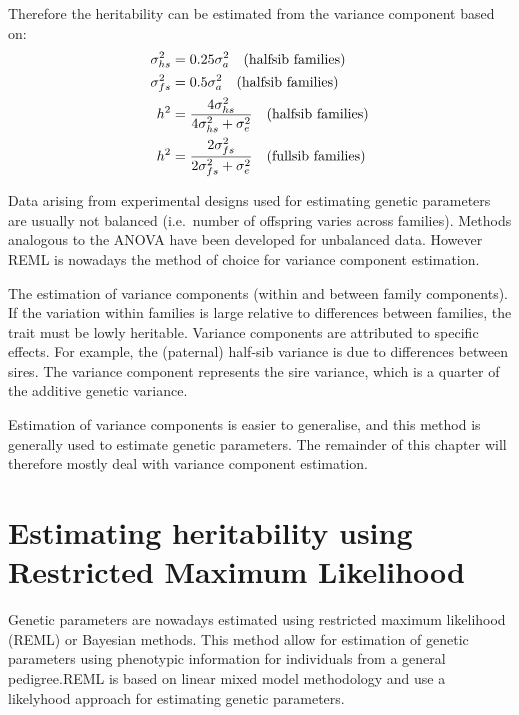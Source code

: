 \documentclass[
]{book}
\begin{document}
Therefore the heritability can be estimated from the variance component based on:\\
\begin{align}
    \sigma_{hs}^2 &= 0.25\sigma_a^2 \quad \text{(halfsib families)} \notag \\
    \sigma_{fs}^2 &= 0.5\sigma_a^2 \quad \text{(halfsib families)} \notag \\
    h^2 &= \frac{4\sigma_{hs}^2}{4\sigma_{hs}^2+\sigma_e^2} \quad \text{(halfsib families)} \notag \\
    h^2 &= \frac{2\sigma_{fs}^2}{2\sigma_{fs}^2+\sigma_e^2} \quad \text{(fullsib families)} \notag \\
\end{align}

Data arising from experimental designs used for estimating genetic parameters
are usually not balanced (i.e.~number of offspring varies across families).
Methods analogous to the ANOVA have been developed for unbalanced data.
However REML is nowadays the method of choice for variance component estimation.

The estimation of variance components (within and between family components). If
the variation within families is large relative to differences between families, the trait
must be lowly heritable. Variance components are attributed to specific effects. For
example, the (paternal) half-sib variance is due to differences between sires. The
variance component represents the sire variance, which is a quarter of the additive
genetic variance.

Estimation of variance components is easier to generalise, and this method is generally
used to estimate genetic parameters. The remainder of this chapter will therefore mostly deal with
variance component estimation.

\hypertarget{estimating-heritability-using-restricted-maximum-likelihood}{%
\section{Estimating heritability using Restricted Maximum Likelihood}\label{estimating-heritability-using-restricted-maximum-likelihood}}

Genetic parameters are nowadays estimated using restricted maximum likelihood (REML) or Bayesian methods.
This method allow for estimation of genetic parameters using phenotypic information for individuals from a general pedigree.REML is based on linear mixed model methodology and use a likelyhood approach for estimating genetic parameters.
\end{document}
